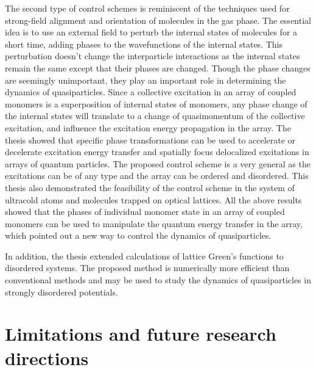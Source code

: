 The second type of control schemes is reminiscent of the techniques used for strong-field alignment and orientation of 
molecules in the gas phase\cite{alignment-review}. The essential idea is to use an external field to perturb the internal states
of molecules for a short time, adding phases to the wavefunctions of the internal states. This perturbation doesn't change
the interparticle interactions as the internal states remain the same except that their phases are changed. Though the phase
changes are seemingly unimportant, they play an important role in determining the dynamics of quasiparticles. Since a collective excitation in an array of coupled monomers is a superposition of internal states of monomers, any phase change
of the internal states will translate to a change of quasimomentum of  the collective excitation, and influence the excitation
energy propagation in the array. The thesis showed that specific phase transformations can be used to accelerate or 
decelerate excitation energy transfer and spatially focus delocalized excitations in arrays of quantum particles.  The 
proposed control scheme is a very general as the excitations can be of any type and the array can be ordered and 
disordered. This thesis also demonstrated the feasibility of the control scheme in the system of ultracold atoms and 
molecules trapped on optical lattices. All the above results showed that the phases of individual monomer state in an array of coupled monomers can be used to manipulate the quantum energy transfer in the array, which 
pointed out a new way to control the dynamics of quasiparticles.  


In addition, the thesis extended calculations of lattice Green's functions to disordered systems. The proposed method
is  numerically more efficient than conventional methods and may be used to study the dynamics of quasiparticles in 
strongly disordered potentials. 

\section{Limitations and future research directions}


